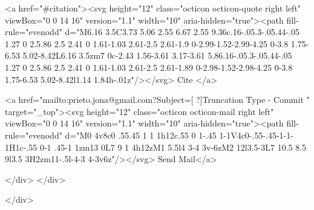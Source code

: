       <a  href="#citation"><svg height="12" class="octicon octicon-quote right left" viewBox="0 0 14 16" version="1.1" width="10" aria-hidden="true"><path fill-rule="evenodd" d="M6.16 3.5C3.73 5.06 2.55 6.67 2.55 9.36c.16-.05.3-.05.44-.05 1.27 0 2.5.86 2.5 2.41 0 1.61-1.03 2.61-2.5 2.61-1.9 0-2.99-1.52-2.99-4.25 0-3.8 1.75-6.53 5.02-8.42L6.16 3.5zm7 0c-2.43 1.56-3.61 3.17-3.61 5.86.16-.05.3-.05.44-.05 1.27 0 2.5.86 2.5 2.41 0 1.61-1.03 2.61-2.5 2.61-1.89 0-2.98-1.52-2.98-4.25 0-3.8 1.75-6.53 5.02-8.42l1.14 1.84h-.01z"/></svg> Cite
      </a>

      <a href="mailto:prieto.jona@gmail.com?Subject=[ ?]Truncation Type - Commit " target="_top"><svg height="12" class="octicon octicon-mail right left" viewBox="0 0 14 16" version="1.1" width="10" aria-hidden="true"><path fill-rule="evenodd" d="M0 4v8c0 .55.45 1 1 1h12c.55 0 1-.45 1-1V4c0-.55-.45-1-1-1H1c-.55 0-1 .45-1 1zm13 0L7 9 1 4h12zM1 5.5l4 3-4 3v-6zM2 12l3.5-3L7 10.5 8.5 9l3.5 3H2zm11-.5l-4-3 4-3v6z"/></svg> Send Mail</a>

    </div>
  </div>

</div>




